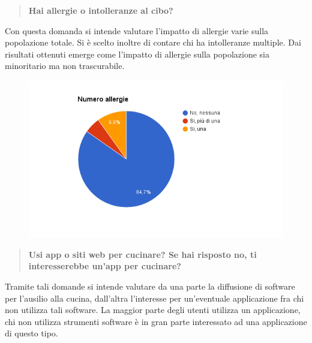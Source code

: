 \begin{quote}
	\textbf{Hai allergie o intolleranze al cibo?}
\end{quote}

Con questa domanda si intende valutare l'impatto di allergie varie sulla popolazione totale. Si è scelto inoltre di contare chi ha intolleranze multiple.
Dai risultati ottenuti emerge come l'impatto di allergie sulla popolazione sia minoritario ma non trascurabile.

\begin{figure}[H]
	\centering
	\includegraphics[scale=0.6]{img/chart_allergie}
\end{figure}

\begin{quote}
	\textbf{Usi app o siti web per cucinare? Se hai risposto no, ti interesserebbe un'app per cucinare?}
\end{quote}

Tramite tali domande si intende valutare da una parte la diffusione di software per l'ausilio alla cucina, dall'altra
l'interesse per un'eventuale applicazione fra chi non utilizza tali software. La maggior parte degli utenti utilizza un applicazione,
chi non utilizza strumenti software è in gran parte interessato ad una applicazione di questo tipo.

